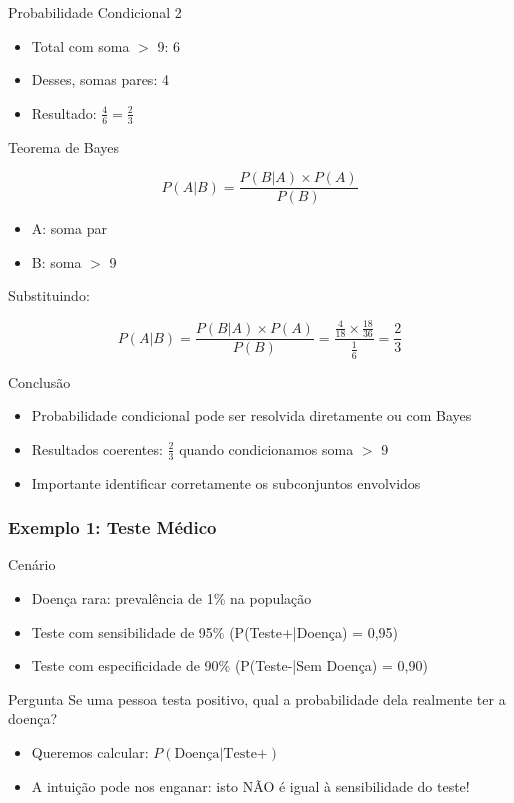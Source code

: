 \documentclass[11pt]{beamer}
\begin{document}
\begin{frame}{Probabilidade Condicional 2}



\begin{itemize}
\item Total com soma $>$ 9: 6
\item Desses, somas pares: 4
\item Resultado: $\frac{4}{6} = \frac{2}{3}$
\end{itemize}
\end{frame}

\begin{frame}{Teorema de Bayes}

$$P(A|B) = \frac{P(B|A) \times P(A)}{P(B)}$$

\begin{itemize}
\item A: soma par
\item B: soma $>$ 9
\end{itemize}
Substituindo:

$$P(A|B) = \frac{P(B|A) \times P(A)}{P(B)} = \frac{\frac{4}{18} \times \frac{18}{36}}{\frac{1}{6}} = \frac{2}{3}$$

\end{frame}

\begin{frame}{Conclusão}
\begin{itemize}
\item Probabilidade condicional pode ser resolvida diretamente ou com Bayes
\item Resultados coerentes: $\frac{2}{3}$ quando condicionamos soma $>$ 9
\item Importante identificar corretamente os subconjuntos envolvidos
\end{itemize}
\end{frame}
\begin{frame}
\frametitle{Exemplo 1: Teste Médico}
\begin{block}{Cenário}
\begin{itemize}
\item Doença rara: prevalência de 1\% na população
\item Teste com sensibilidade de 95\% (P(Teste+|Doença) = 0,95)
\item Teste com especificidade de 90\% (P(Teste-|Sem Doença) = 0,90)
\end{itemize}
\end{block}

\begin{alertblock}{Pergunta}
Se uma pessoa testa positivo, qual a probabilidade dela realmente ter a doença?
\end{alertblock}

\begin{itemize}
\item Queremos calcular: $P(\text{Doença}|\text{Teste+})$
\item A intuição pode nos enganar: isto NÃO é igual à sensibilidade do teste!
\end{itemize}
\end{frame}
\end{document}
